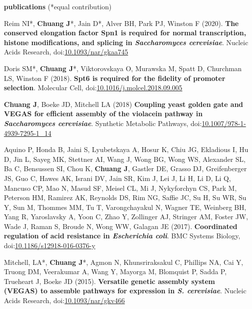 \documentclass[11pt, a4paper]{article}
\begin{document}
\vspace{2em}
\textbf{\Large publications} (*equal contribution)
\begin{description}[topsep=2pt, align=right, leftmargin=!, labelwidth=\widthof{\textbf{2018}}]
    \item [2020] Reim NI*, \textbf{Chuang J}*, Jain D*, Alver BH, Park PJ, Winston F (2020). \textbf{The conserved elongation factor Spn1 is required for normal transcription, histone modifications, and splicing in \textit{Saccharomyces cerevisiae}}. Nucleic Acids Research, \linebreak doi:\href{https://doi.org/10.1093/nar/gkaa745}{10.1093/nar/gkaa745}
    \item [2018] Doris SM*, \textbf{Chuang J}*, Viktorovskaya O, Murawska M, Spatt D, Churchman LS, Winston F (2018). \textbf{Spt6 is required for the fidelity of promoter selection}. Molecular Cell, doi:\href{https://doi.org/10.1016/j.molcel.2018.09.005}{10.1016/j.molcel.2018.09.005}
    \item [2018] \textbf{Chuang J}, Boeke JD, Mitchell LA (2018) \textbf{Coupling yeast golden gate and VEGAS for efficient assembly of the violacein pathway in \textit{Saccharomyces cerevisiae}}. Synthetic Metabolic Pathways, doi:\href{https://doi.org/10.1007/978-1-4939-7295-1_14}{10.1007/978-1-4939-7295-1\_14}
    \item [2017] Aquino P, Honda B, Jaini S, Lyubetskaya A, Hosur K, Chiu JG, Ekladious I, Hu D, Jin L, Sayeg MK, Stettner AI, Wang J, Wong BG, Wong WS, Alexander SL, Ba C, Bensussen SI, Chou K, \textbf{Chuang J}, Gastler DE, Grasso DJ, Greifenberger JS, Guo C, Hawes AK, Israni DV, Jain SR, Kim J, Lei J, Li H, Li D, Li Q, Mancuso CP, Mao N, Masud SF, Meisel CL, Mi J, Nykyforchyn CS, Park M, Peterson HM, Ramirez AK, Reynolds DS, Rim NG, Saffie JC, Su H, Su WR, Su Y, Sun M, Thommes MM, Tu T, Varongchayakul N, Wagner TE, Weinberg BH, Yang R, Yaroslavsky A, Yoon C, Zhao Y, Zollinger AJ, Stringer AM, Foster JW, Wade J, Raman S, Broude N, Wong WW, Galagan JE (2017). \textbf{Coordinated regulation of acid resistance in \textit{Escherichia coli}}. BMC Systems Biology, doi:\href{https://doi.org/10.1186/s12918-016-0376-y}{10.1186/s12918-016-0376-y}
    \item [2015] Mitchell, LA*, \textbf{Chuang J}*, Agmon N, Khunsriraksakul C, Phillips NA, Cai Y, Truong DM, Veerakumar A, Wang Y, Mayorga M, Blomquist P, Sadda P, Trueheart J, Boeke JD (2015). \textbf{Versatile genetic assembly system (VEGAS) to assemble pathways for expression in \textit{S. cerevisiae}}. Nucleic Acids Research, doi:\href{https://doi.org/10.1093/nar/gkv466}{10.1093/nar/gkv466}

\end{description}
\end{document}
